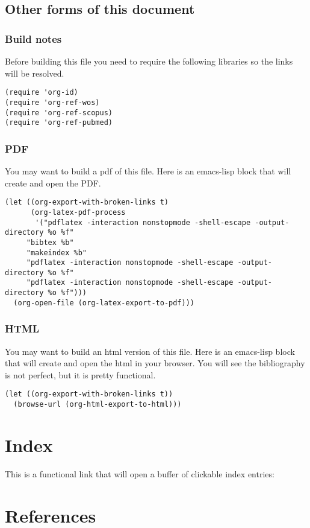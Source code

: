 \documentclass[11pt]{article}
\begin{document}
\subsection{Other forms of this document}
\label{sec:orgcccb772}
\subsubsection{Build notes}
\label{sec:org218bbd9}

Before building this file you need to require the following libraries so the links will be resolved.

\begin{verbatim}
(require 'org-id)
(require 'org-ref-wos)
(require 'org-ref-scopus)
(require 'org-ref-pubmed)
\end{verbatim}

\subsubsection{PDF}
\label{sec:orgf395c5f}

You may want to build a pdf of this file. Here is an emacs-lisp block that will create and open the PDF.

\begin{verbatim}
(let ((org-export-with-broken-links t)
      (org-latex-pdf-process
       '("pdflatex -interaction nonstopmode -shell-escape -output-directory %o %f"
	 "bibtex %b"
	 "makeindex %b"
	 "pdflatex -interaction nonstopmode -shell-escape -output-directory %o %f"
	 "pdflatex -interaction nonstopmode -shell-escape -output-directory %o %f")))
  (org-open-file (org-latex-export-to-pdf)))
\end{verbatim}


\subsubsection{HTML}
\label{sec:orge88e260}

You may want to build an html version of this file. Here is an emacs-lisp block that will create and open the html in your browser. You will see the bibliography is not perfect, but it is pretty functional.

\begin{verbatim}
(let ((org-export-with-broken-links t))
  (browse-url (org-html-export-to-html)))
\end{verbatim}

\section{Index}
\label{sec:orgdf28bb9}

This is a functional link that will open a buffer of clickable index entries:

\renewcommand{\indexname}{}
\printindex

\section{References}
\label{sec:org4e76a1c}

\label{org41bcf24}


\label{org512c9b8}

\end{document}
